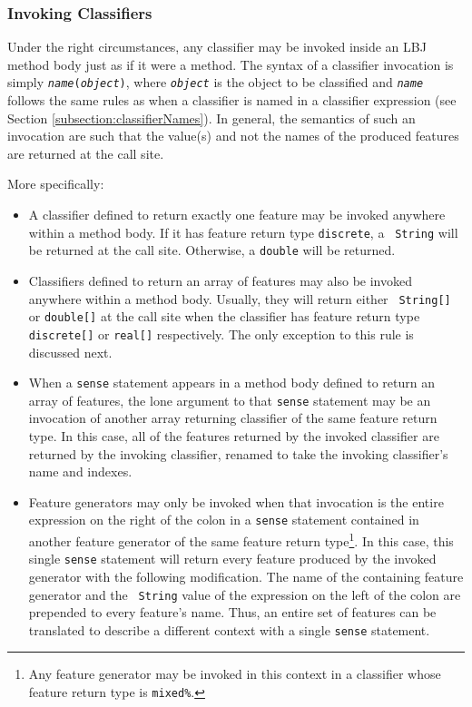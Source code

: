 \subsubsection{Invoking Classifiers} \label{subsection:invokingClassifiers}
Under the right circumstances, any classifier may be invoked inside an LBJ
method body just as if it were a method.  The syntax of a classifier
invocation is simply {\tt \emph{name}(\emph{object})}, where
{\tt\emph{object}} is the object to be classified and {\tt\emph{name}} follows
the same rules as when a classifier is named in a classifier expression (see
Section \ref{subsection:classifierNames}).  In general, the semantics of such
an invocation are such that the value(s) and not the names of the produced
features are returned at the call site.

More specifically:

\vspace{-.15cm}
\begin{itemize}
\item
A classifier defined to return exactly one feature may be invoked anywhere
within a method body.  If it has feature return type {\tt discrete}, a {\tt
String} will be returned at the call site.  Otherwise, a {\tt double} will be
returned.

\item
Classifiers defined to return an array of features may also be invoked
anywhere within a method body.  Usually, they will return either {\tt
String[]} or {\tt double[]} at the call site when the classifier has feature
return type {\tt discrete[]} or {\tt real[]} respectively.  The only exception
to this rule is discussed next.

\item
When a {\tt sense} statement appears in a method body defined to return an
array of features, the lone argument to that {\tt sense} statement may be an
invocation of another array returning classifier of the same feature return
type.  In this case, all of the features returned by the invoked classifier
are returned by the invoking classifier, renamed to take the invoking
classifier's name and indexes.

\item
Feature generators may only be invoked when that invocation is the entire
expression on the right of the colon in a {\tt sense} statement contained in
another feature generator of the same feature return type\footnote{Any feature
generator may be invoked in this context in a classifier whose feature return
type is {\tt mixed\%}.}.  In this case, this single {\tt sense} statement will
return every feature produced by the invoked generator with the following
modification.  The name of the containing feature generator and the {\tt
String} value of the expression on the left of the colon are prepended to
every feature's name.  Thus, an entire set of features can be translated to
describe a different context with a single {\tt sense} statement.
\end{itemize}


